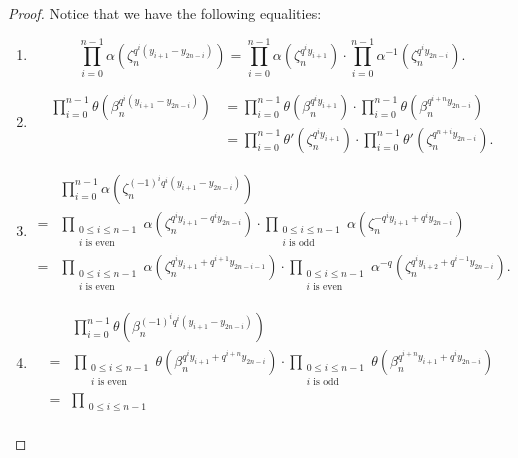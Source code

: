 \documentclass[12pt, reqno]{amsart}
\theoremstyle{definition}
\theoremstyle{definition}
\theoremstyle{definition}
\begin{document}
\begin{proof}
Notice that we have the following equalities:
\begin{enumerate}
	\item $$\prod_{i=0}^{n-1} \alpha\left(\zeta_n^{q^i \left(y_{i+1}-y_{2n-i}\right)}\right) = \prod_{i=0}^{n-1} \alpha\left(\zeta_n^{q^i y_{i+1}}\right) \cdot \prod_{i=0}^{n-1} \alpha^{-1}\left(\zeta_n^{q^i y_{2n-i}}\right).$$
	\item \begin{align*}
		\prod_{i=0}^{n-1} \theta\left(\beta_n^{ q^i \left(y_{i+1}-y_{2n-i}\right)}\right) &= \prod_{i=0}^{n-1} \theta\left(\beta_n^{ q^i y_{i+1}}\right) \cdot \prod_{i=0}^{n-1} \theta\left(\beta_n^{ q^{i+n} y_{2n-i}}\right) \\
		&= \prod_{i=0}^{n-1} \theta'\left(\zeta_n^{q^i y_{i+1}}\right) \cdot \prod_{i=0}^{n-1} \theta'\left(\zeta_n^{q^{n+i} y_{2n-i}}\right).
	\end{align*}
	\item \begin{align*}
		& \prod_{i=0}^{n-1} \alpha\left(\zeta_n^{\left(-1\right)^i q^i \left(y_{i+1} - y_{2n-i}\right)}\right)\\
		=& \prod_{\substack{0 \le i \le n-1\\
				i \text{ is even}}} \alpha\left(\zeta_n^{q^{i} y_{i+1} - q^{i} y_{2n-i}}\right) \cdot \prod_{\substack{0 \le i \le n-1\\
				i \text{ is odd}}} \alpha\left(\zeta_n^{-q^{i} y_{i+1} + q^{i} y_{2n-i}}\right) \\
			=& \prod_{\substack{0 \le i \le n-1\\
					i \text{ is even}}} \alpha\left(\zeta_n^{q^{i} y_{i+1} + q^{i + 1} y_{2n-i-1}}\right) \cdot \prod_{\substack{0 \le i \le n-1\\
					i \text{ is even}}} \alpha^{-q}\left(\zeta_n^{q^{i} y_{i+2} + q^{i-1} y_{2n-i}}\right).
	\end{align*}
	\item \begin{align*}
		&\prod_{i=0}^{n-1} \theta\left( \beta_n^{\left(-1\right)^i q^i \left(y_{i+1} - y_{2n - i}\right)}\right)\\
		 = & \prod_{\substack{0 \le i \le n-1\\
				i \text{ is even}}} \theta\left(\beta_n^{q^{i} y_{i+1} + q^{i+n} y_{2n-i}}\right) \cdot \prod_{\substack{0 \le i \le n-1\\
				i \text{ is odd}}} \theta\left(\beta_n^{q^{i+n} y_{i+1} + q^{i} y_{2n-i}}\right)\\
			= &\prod_{\substack{0 \le i \le n-1\\
}}
\end{align*}
\end{enumerate}
\end{proof}
\end{document}
